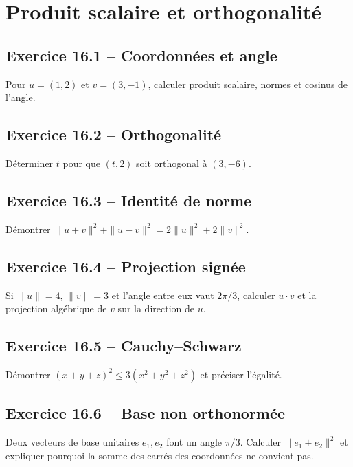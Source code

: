 \chapter{Produit scalaire et orthogonalité}
\section*{Exercice 16.1 -- Coordonnées et angle}
Pour $u=(1,2)$ et $v=(3,-1)$, calculer produit scalaire, normes et cosinus de l'angle.

\section*{Exercice 16.2 -- Orthogonalité}
Déterminer $t$ pour que $(t,2)$ soit orthogonal à $(3,-6)$.

\section*{Exercice 16.3 -- Identité de norme}
Démontrer $\|u+v\|^2+\|u-v\|^2=2\|u\|^2+2\|v\|^2$.

\section*{Exercice 16.4 -- Projection signée}
Si $\|u\|=4$, $\|v\|=3$ et l'angle entre eux vaut $2\pi/3$, calculer $u\cdot v$ et la projection algébrique de $v$ sur la direction de $u$.

\section*{Exercice 16.5 -- Cauchy--Schwarz}
Démontrer $(x+y+z)^2\le3(x^2+y^2+z^2)$ et préciser l'égalité.

\section*{Exercice 16.6 -- Base non orthonormée}
Deux vecteurs de base unitaires $e_1,e_2$ font un angle $\pi/3$. Calculer $\|e_1+e_2\|^2$ et expliquer pourquoi la somme des carrés des coordonnées ne convient pas.
